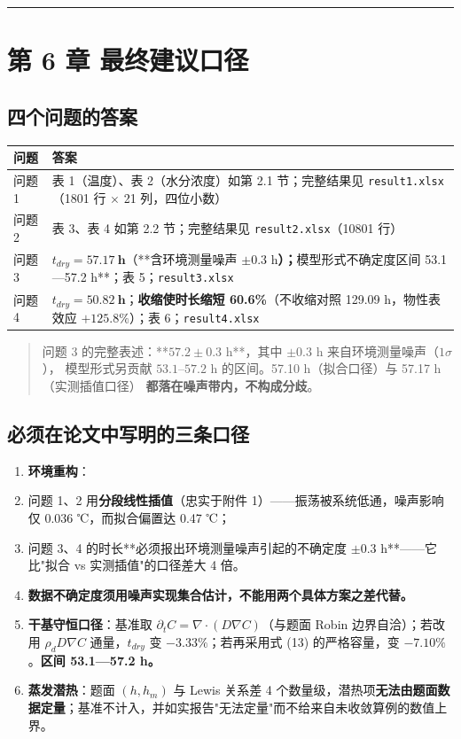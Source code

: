 \vspace{1mm}\hrule\vspace{1mm}


\section{第 6 章 最终建议口径}


\subsection{四个问题的答案}


\begin{center}
\small
\begin{tabular}{ll}
\toprule
问题 & 答案 \\
\midrule
问题 1 & 表 1（温度）、表 2（水分浓度）如第 2.1 节；完整结果见 \texttt{result1.xlsx}（1801 行 $\times$ 21 列，四位小数） \\
问题 2 & 表 3、表 4 如第 2.2 节；完整结果见 \texttt{result2.xlsx}（10801 行） \\
问题 3 & $t_{dry}=\mathbf{57.17\ h}$（**含环境测量噪声 $\pm0.3$ h\textbf{）；}模型形式不确定度区间 53.1—57.2 h**；表 5；\texttt{result3.xlsx} \\
问题 4 & $t_{dry}=\mathbf{50.82\ h}$；\textbf{收缩使时长缩短 60.6\%}（不收缩对照 129.09 h，物性表效应 $+125.8\%$）；表 6；\texttt{result4.xlsx} \\
\bottomrule
\end{tabular}
\end{center}


\begin{quote}
问题 3 的完整表述：**$57.2\pm0.3$ h**，其中 $\pm0.3$ h 来自环境测量噪声（$1\sigma$）， 模型形式另贡献 $53.1$–$57.2$ h 的区间。57.10 h（拟合口径）与 57.17 h（实测插值口径） \textbf{都落在噪声带内，不构成分歧}。
\end{quote}


\subsection{必须在论文中写明的三条口径}


\begin{enumerate}
\item \textbf{环境重构}：
\item 问题 1、2 用\textbf{分段线性插值}（忠实于附件 1）——振荡被系统低通，噪声影响仅 0.036 ℃，而拟合偏置达 0.47 ℃；
\item 问题 3、4 的时长**必须报出环境测量噪声引起的不确定度 $\pm0.3$ h**——它比"拟合 vs 实测插值"的口径差大 4 倍。
\item \textbf{数据不确定度须用噪声实现集合估计，不能用两个具体方案之差代替。}
\item \textbf{干基守恒口径}：基准取 $\partial_tC=\nabla\!\cdot\!(D\nabla C)$（与题面 Robin 边界自洽）；若改用 $\rho_dD\nabla C$ 通量，$t_{dry}$ 变 $-3.33\%$；若再采用式 (13) 的严格容量，变 $-7.10\%$。\textbf{区间 53.1—57.2 h。}
\item \textbf{蒸发潜热}：题面 $(h,h_m)$ 与 Lewis 关系差 4 个数量级，潜热项\textbf{无法由题面数据定量}；基准不计入，并如实报告"无法定量"而不给来自未收敛算例的数值上界。
\end{enumerate}


